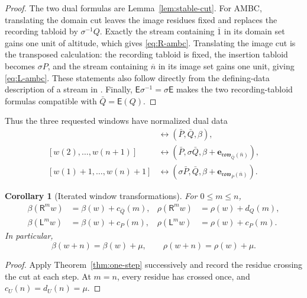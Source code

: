 \documentclass[11pt]{article}
\newtheorem{corollary}[theorem]{Corollary}
\theoremstyle{definition}
\theoremstyle{remark}
\newcommand{\ol}[1]{\overline{#1}}
\newcommand{\row}{\mathfrak{row}}
\newcommand{\e}{\mathbf e}
\newcommand{\Rop}{\mathsf R}
\newcommand{\Lop}{\mathsf L}
\newcommand{\E}{\mathsf E}
\begin{document}
\begin{proof}
The two dual formulas are Lemma~\ref{lem:stable-cut}.  For AMBC, translating the domain
cut leaves the image residues fixed and replaces the recording tabloid by
\(\sigma^{-1}Q\).  Exactly the stream containing \(\ol1\) in its domain set gains one
unit of altitude, which gives \eqref{eq:R-ambc}.  Translating the image cut is the
transposed calculation: the recording tabloid is fixed, the insertion tabloid becomes
\(\sigma P\), and the stream containing \(\ol n\) in its image set gains one unit,
giving \eqref{eq:L-ambc}.  These statements also follow directly from the defining-data
description of a stream in \cite[Section~3.4]{CPY18}.  Finally,
\(\E\sigma^{-1}=\sigma\E\) makes the two recording-tabloid formulas compatible with
\(\bar Q=\E(Q)\).
\end{proof}

Thus the three requested windows have normalized dual data
\begin{align*}
 [w(1),\ldots,w(n)]
   &\longleftrightarrow (\bar P,\bar Q,\beta),\\
 [w(2),\ldots,w(n+1)]
   &\longleftrightarrow
   (\bar P,\sigma\bar Q,\beta+\e_{\row_{\bar Q}(\ol n)}),\\
 [w(1)+1,\ldots,w(n)+1]
   &\longleftrightarrow
   (\sigma\bar P,\bar Q,\beta+\e_{\row_{\bar P}(\ol n)}).
\end{align*}

\begin{corollary}[Iterated window transformations]\label{cor:iterated-shifts}
For \(0\le m\le n\),
\begin{align}
 \beta(\Rop^m w)&=\beta(w)+c_{\bar Q}(m),&
 \rho(\Rop^m w)&=\rho(w)+d_Q(m),
 \label{eq:iterate-R}\\
 \beta(\Lop^m w)&=\beta(w)+c_P(m),&
 \rho(\Lop^m w)&=\rho(w)+c_P(m).
 \label{eq:iterate-L}
\end{align}
In particular,
\begin{equation}\label{eq:central-shift}
 \beta(w+n)=\beta(w)+\mu,
 \qquad
 \rho(w+n)=\rho(w)+\mu.
\end{equation}
\end{corollary}

\begin{proof}
Apply Theorem~\ref{thm:one-step} successively and record the residue crossing the cut at
each step.  At \(m=n\), every residue has crossed once, and
\(c_U(n)=d_U(n)=\mu\).
\end{proof}
\end{document}
